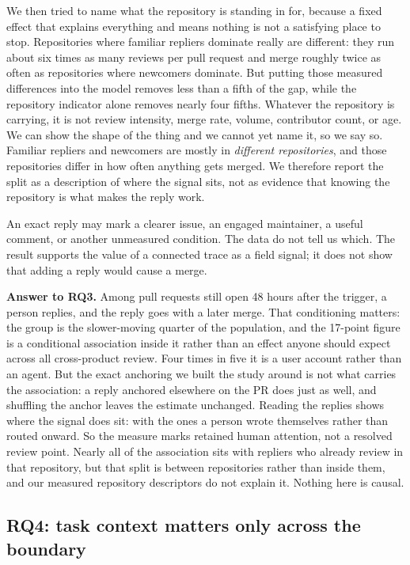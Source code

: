 \documentclass[lineno,pdflatex,sn-basic]{sn-jnl}
\begin{document}
We then tried to name what the repository is standing in for, because a fixed
effect that explains everything and means nothing is not a satisfying place to
stop. Repositories where familiar repliers dominate really are different: they
run about six times as many reviews per pull request and merge roughly twice as
often as repositories where newcomers dominate. But putting those measured
differences into the model removes less than a fifth of the gap, while the
repository indicator alone removes nearly four fifths. Whatever the repository is
carrying, it is not review intensity, merge rate, volume, contributor count, or
age. We can show the shape of the thing and we cannot yet name it, so we say so. Familiar repliers and newcomers are mostly in
\emph{different repositories}, and those repositories differ in how often
anything gets merged. We therefore report the split as a description of where
the signal sits, not as evidence that knowing the repository is what makes the
reply work.

An exact reply may mark a clearer issue, an engaged maintainer, a useful
comment, or another unmeasured condition. The data do not tell us which. The
result supports the value of a connected trace as a field signal; it does not
show that adding a reply would cause a merge.

\noindent\textbf{Answer to RQ3.} Among pull requests still open 48 hours after
the trigger, a person replies, and the reply goes with a later merge. That
conditioning matters: the group is the slower-moving quarter of the population,
and the 17-point figure is a conditional association inside it rather than an
effect anyone should expect across all cross-product review. Four times in five it is a user account rather than an agent. But the
exact anchoring we built the study around is not what carries the association: a
reply anchored elsewhere on the PR does just as well, and shuffling the anchor
leaves the estimate unchanged. Reading the replies shows where the signal does sit: with the ones a person
wrote themselves rather than routed onward. So the
measure marks retained human attention, not a resolved review point. Nearly all
of the association sits with repliers who already review in that repository, but
that split is between repositories rather than inside them, and our measured
repository descriptors do not explain it. Nothing here is causal.

\FloatBarrier
\subsection{RQ4: task context matters only across the boundary}
\end{document}
